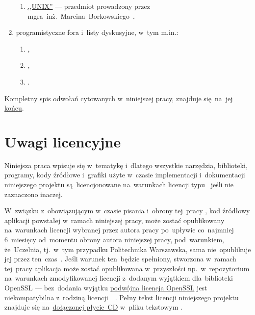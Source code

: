 \documentclass[thesis]{subfiles}
\begin{document}
\begin{enumerate}
\begin{enumerate}
		\item \href{http://www.mini.pw.edu.pl/~marcinbo/strona/glowna/unix.html}{,,UNIX''} --- przedmiot prowadzony przez mgra~inż.~Marcina~Borkowskiego~\cite{borkowski}.
	\end{enumerate}
	\item programistyczne fora i~listy dyskusyjne, w~tym m.in.:\mynobreakpar
	\begin{enumerate}
		\item {},
		\item {},
		\item {}.
	\end{enumerate}
\end{enumerate}
Kompletny spis odwołań cytowanych w~niniejszej pracy, znajduje się~na~jej \hyperref[bibliography-page]{końcu}. %


\section{Uwagi licencyjne}

Niniejsza praca wpisuje się w~tematykę  i~dlatego wszystkie narzędzia, biblioteki, programy, kody źródłowe i~grafiki użyte w~czasie implementacji i~dokumentacji niniejszego projektu są~licencjonowane na~warunkach licencji typu~\emph{} jeśli nie zaznaczono inaczej.

W~związku z~obowiązującym w~czasie pisania i~obrony tej~pracy , kod źródłowy aplikacji powstałej w~ramach niniejszej pracy, może zostać opublikowany na~warunkach licencji wybranej przez autora pracy po~upływie co~najmniej 6~miesięcy od~momentu obrony autora niniejszej pracy, pod~warunkiem, że~Uczelnia, tj.~w~tym przypadku Politechnika Warszawska, sama nie~opublikuje jej przez ten~czas~\cite{papp}. Jeśli warunek ten~będzie spełniony, stworzona w~ramach tej~pracy aplikacja może zostać opublikowana w~przyszłości np.~w~repozytorium  na~warunkach zmodyfikowanej licencji  z~dodanym wyjątkiem dla~biblioteki OpenSSL --- bez~dodania wyjątku \href{https://www.openssl.org/source/license.html}{podwójna licencja OpenSSL} jest \href{https://www.openssl.org/docs/faq.html\#LEGAL2}{niekompatybilna} z~rodziną licencji~~\cite{openssl-license-incompatibility,openssl-license-incompatibility-2}. Pełny tekst licencji niniejszego projektu znajduje się na~\hyperref[ch:cd-appendix]{dołączonej płycie~CD} w~pliku tekstowym .
\end{document}
